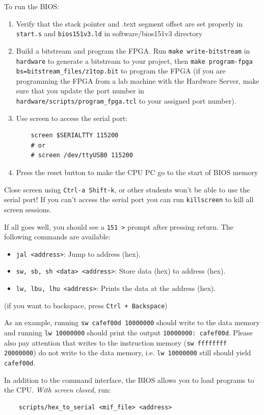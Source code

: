 \documentclass[11pt]{article}
\begin{document}
To run the BIOS:
\begin{enumerate}
  \item Verify that the stack pointer and .text segment offset are set properly in \verb|start.s| and \verb|bios151v3.ld| in software/bios151v3 directory
  \item Build a bitstream and program the FPGA. Run \verb|make write-bitstream| in \verb|hardware| to generate a bitstream to your project, then \verb|make program-fpga bs=bitstream_files/z1top.bit| to program the FPGA (if you are programming the FPGA from a lab machine with the Hardware Server, make sure that you update the port number in \verb|hardware/scripts/program_fpga.tcl| to your assigned port number).
  \item Use screen to access the serial port:
    \begin{verbatim}
    screen $SERIALTTY 115200
    # or 
    # screen /dev/ttyUSB0 115200
    \end{verbatim}
  \item Press the reset button to make the CPU PC go to the start of BIOS memory
\end{enumerate}

Close screen using \verb|Ctrl-a Shift-k|, or other students won't be able to use the serial port!
If you can't access the serial port you can run \verb|killscreen| to kill all screen sessions.

If all goes well, you should see a \verb|151 >| prompt after pressing return. The following commands are available:
\begin{itemize}
    \item \verb|jal <address>|: Jump to address (hex).
    \item \verb|sw, sb, sh <data> <address>|: Store data (hex) to address (hex).
    \item \verb|lw, lbu, lhu <address>|: Prints the data at the address (hex).
\end{itemize}

(if you want to backspace, press \verb|Ctrl + Backspace|)

As an example, running \verb|sw cafef00d 10000000| should write to the data memory and running \verb|lw 10000000| should print the output \verb|10000000: cafef00d|.
Please also pay attention that writes to the instruction memory (\verb|sw ffffffff 20000000|) do not write to the data memory, i.e. \verb|lw 10000000| still should yield \verb|cafef00d|.

In addition to the command interface, the BIOS allows you to load programs to the CPU. \textit{With screen closed}, run:
\begin{verbatim}
    scripts/hex_to_serial <mif_file> <address>
\end{verbatim}
\end{document}
